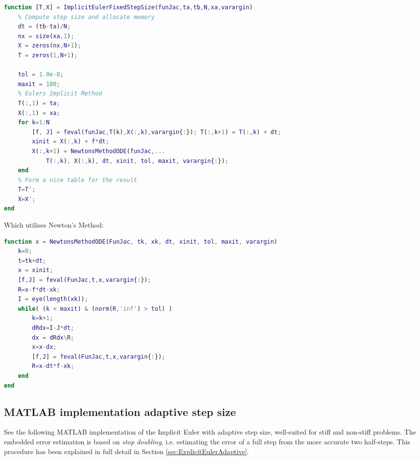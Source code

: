 \begin{adjustwidth*}{0cm}{-0.4cm}
\begin{lstlisting}[frame=single, language=Matlab,caption=Implicit Euler (fixed step size), label=ImplicittEulerFixie]
function [T,X] = ImplicitEulerFixedStepSize(funJac,ta,tb,N,xa,varargin)
    % Compute step size and allocate memory
    dt = (tb-ta)/N;
    nx = size(xa,1);
    X = zeros(nx,N+1);
    T = zeros(1,N+1);

    tol = 1.0e-8;
    maxit = 100;
    % Eulers Implicit Method
    T(:,1) = ta;
    X(:,1) = xa;
    for k=1:N
        [f, J] = feval(funJac,T(k),X(:,k),varargin{:}); T(:,k+1) = T(:,k) + dt;
        xinit = X(:,k) + f*dt;
        X(:,k+1) = NewtonsMethodODE(funJac,...
            T(:,k), X(:,k), dt, xinit, tol, maxit, varargin{:});
    end
    % Form a nice table for the result
    T=T';
    X=X';
end
\end{lstlisting}
\end{adjustwidth*}

Which utilises Newton's Method:

\begin{adjustwidth*}{0cm}{-0.4cm}
\begin{lstlisting}[frame=single, language=Matlab,caption=Newton's Method, label=Newton]
function x = NewtonsMethodODE(FunJac, tk, xk, dt, xinit, tol, maxit, varargin)
    k=0;
    t=tk+dt;
    x = xinit;
    [f,J] = feval(FunJac,t,x,varargin{:});
    R=x-f*dt-xk;
    I = eye(length(xk));
    while( (k < maxit) & (norm(R,'inf') > tol) )
        k=k+1;
        dRdx=I-J*dt;
        dx = dRdx\R;
        x=x-dx;
        [f,J] = feval(FunJac,t,x,varargin{:});
        R=x-dt*f-xk;
    end
end
\end{lstlisting}
\end{adjustwidth*}















\subsection{MATLAB implementation adaptive step size}
See the following MATLAB implementation of the Implicit Euler with adaptive step size, well-suited for stiff and non-stiff problems. The embedded error estimation is based on \textit{stop doubling}, i.e. estimating the error of a full step from the more accurate two half-steps. This procedure has been explained in full detail in Section \ref{sec:ExplicitEulerAdaptive}.

